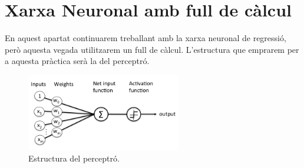 %
%
%
%
\clearpage
\section{Xarxa Neuronal amb full de càlcul}\label{sec:11}
En aquest apartat continuarem treballant amb la xarxa neuronal de regressió, però aquesta vegada utilitzarem un full de càlcul.
L’estructura que emprarem per a aquesta pràctica serà la del perceptró.

\begin{figure}[h!]
    \centering
    \includegraphics[width=0.6\textwidth]{./figures/perceptro.png}
    \caption{Estructura del perceptró.~\cite{Img_perceptro}}
\end{figure}

